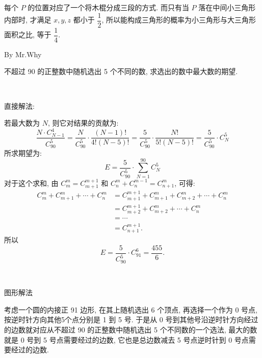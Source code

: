 每个 $P$ 的位置对应了一个将木棍分成三段的方式. 而只有当 $P$ 落在中间小三角形内部时, 才满足 $x,y,z$ 都小于 $\dfrac{1}{2}$, 所以能构成三角形的概率为小三角形与大三角形面积之比, 等于 $\dfrac{1}{4}$.

\newpage
\noindent By Mr.Why

不超过 90 的正整数中随机选出 5 个不同的数, 求选出的数中最大数的期望.

~

\noindent 直接解法:

若最大数为 $N$, 则它对结果的贡献为:
\[\frac{N\cdot C_{N-1}^4}{C_{90}^5}=\frac{N}{C_{90}^5}\cdot\frac{(N-1)!}{4!(N-5)!}=\frac{5}{C_{90}^5}\cdot\frac{N!}{5!(N-5)!}=\frac{5}{C_{90}^5}\cdot C_{N}^{5}\]
所求期望为:
\[E = \frac{5}{C_{90}^5}\cdot\sum_{N=1}^{90}{C_N^5}\]
对于这个求和, 由 $C_m^m=C_{m+1}^{m+1}$ 和 $C_n^m + C_n^{m-1}=C_{n+1}^m$, 可得:
\begin{align*}
C_m^m + C_{m+1}^m+\cdots+C_n^m &= C_{m+1}^{m+1}+ C_{m+1}^m + C_{m+2}^m + \cdots + C_n^m \\
&= C_{m+2}^{m+1} + C_{m+2}^m + \cdots + C_n^m \\
&= \cdots \\
&= C_{n+1}^{m+1}.
\end{align*}
所以 
\[E=\frac{5}{C_{90}^5}\cdot C_{91}^6 = \frac{455}{6}.\]

~

\noindent 图形解法

\begin{figure}
\end{figure}

考虑一个圆的内接正 91 边形, 在其上随机选出 6 个顶点, 再选择一个作为 0 号点, 按逆时针方向其他5个点分别是 1 到 5 号. 于是从 0 号到其他号沿逆时针方向经过的边数就对应从不超过 90 的正整数中随机选出 5 个不同数的一个选法, 最大的数就是 0 号到 5 号点需要经过的边数, 它也是总边数减去 5 号点逆时针到 0 号点需要经过的边数. 


